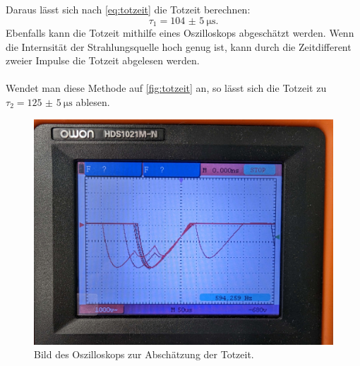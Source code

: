 Daraus lässt sich nach \autoref{eq:totzeit} die Totzeit berechnen:
\begin{equation*}
  \tau_1 = \SI{104(5)}{\micro\s}.
\end{equation*}
Ebenfalls kann die Totzeit mithilfe eines Oszilloskops abgeschätzt werden. Wenn die Internsität der Strahlungsquelle hoch genug ist,
kann durch die Zeitdifferent zweier Impulse die Totzeit abgelesen werden.
\\
\\
Wendet man diese Methode auf \autoref{fig:totzeit} an, so lässt sich die Totzeit zu $\tau_2 = \SI{125(5)}{\micro\s}$ ablesen.
\begin{figure}[H]
  \includegraphics[width=\textwidth]{content/oszilloskop.jpg}
  \caption{Bild des Oszilloskops zur Abschätzung der Totzeit.}
  \label{fig:totzeit}
\end{figure}

\newpage